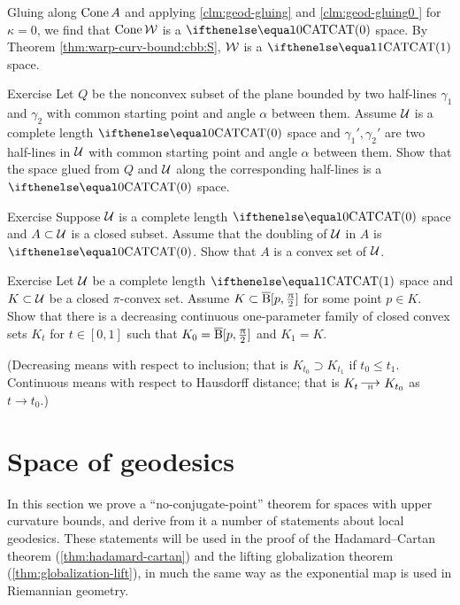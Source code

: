 Gluing along $\mathop{\rm Cone}\nolimits A$ and applying \ref{clm:geod-gluing} and \ref{clm:geod-gluing0 } for $\kappa=0$, we find that 
$\mathop{\rm Cone}\nolimits\mathcal{W}$ is a $\CAT0$ space.  By Theorem \ref{thm:warp-curv-bound:cbb:S}, $\mathcal{W}$ is a $\CAT1$ space.
\qeds

\begin{thm}{Exercise}\label{ex:two-rays}
Let $Q$ be the nonconvex subset of the plane 
bounded by two half-lines $\gamma_1$ and $\gamma_2$
with common starting point and angle $\alpha$ between them.
Assume $\mathcal{U}$ is a complete length $\CAT0$ space
and $\gamma_1',\gamma_2'$ are two half-lines in $\mathcal{U}$ with common
starting point and angle $\alpha$ between them.
Show that the space glued from $Q$ and $\mathcal{U}$ along the corresponding half-lines is a $\CAT{0}$ space.
\end{thm}

\begin{thm}{Exercise}\label{ex:reshetnyak-doubling}
Suppose $\mathcal{U}$ is a complete length $\CAT0$ space and $A\subset \spc{U}$ is a closed subset.
Assume that the doubling of $\mathcal{U}$ in $A$ is $\CAT0$. 
Show that $A$ is a convex set of $\mathcal{U}$.
\end{thm}

\begin{thm}{Exercise}\label{ex:glue-spherical-suspension}
Let  $\mathcal{U}$ be a complete length $\CAT1$ space and $K\subset \spc{U}$ be a closed $\pi$-convex set.
Assume $K\subset \cBall[p,\tfrac\pi2]$ for some point $p\in K$.
Show that there is a decreasing continuous one-parameter family of closed convex sets $K_t$ for $t\in[0,1]$ such that $K_0=\overline{\mathrm{B}}{}[p,\tfrac{\uppi}2]$ and $K_1=K$.

(Decreasing means with respect to inclusion; that is $K_{t_0}\supset K_{t_1}$ if $t_0\le t_1$.
Continuous means with respect to Hausdorff distance; that is $K_t\Hto K_{t_0}$ as $t\to t_0$.)
\end{thm}



\section{Space of geodesics}\label{sec:geod-space}

In this section we prove a  ``no-conjugate-point'' theorem for spaces with upper curvature bounds, and derive from it a number of statements about
local geodesics.  These statements will be used in the proof of the Hadamard--Cartan theorem (\ref{thm:hadamard-cartan}) and the lifting
 globalization theorem (\ref{thm:globalization-lift}), in much the same way as  the exponential map is used in Riemannian geometry.

